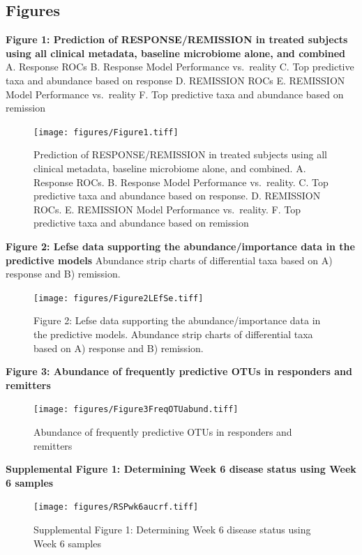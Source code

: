 \documentclass[11pt,]{article}
\begin{document}
\newpage

\subsection{Figures}\label{figures}

\textbf{Figure 1: Prediction of RESPONSE/REMISSION in treated subjects
using all clinical metadata, baseline microbiome alone, and combined} A.
Response ROCs B. Response Model Performance vs.~reality C. Top
predictive taxa and abundance based on response D. REMISSION ROCs E.
REMISSION Model Performance vs.~reality F. Top predictive taxa and
abundance based on remission

\begin{figure}
\centering
\texttt{[image: figures/Figure1.tiff]}
\caption{Prediction of RESPONSE/REMISSION in treated subjects using all
clinical metadata, baseline microbiome alone, and combined. A. Response
ROCs. B. Response Model Performance vs.~reality. C. Top predictive taxa
and abundance based on response. D. REMISSION ROCs. E. REMISSION Model
Performance vs.~reality. F. Top predictive taxa and abundance based on
remission}
\end{figure}

\newpage

\textbf{Figure 2: Lefse data supporting the abundance/importance data in
the predictive models} Abundance strip charts of differential taxa based
on A) response and B) remission.

\begin{figure}
\centering
\texttt{[image: figures/Figure2LEfSe.tiff]}
\caption{Figure 2: Lefse data supporting the abundance/importance data
in the predictive models. Abundance strip charts of differential taxa
based on A) response and B) remission.}
\end{figure}

\newpage

\textbf{Figure 3: Abundance of frequently predictive OTUs in responders
and remitters}

\begin{figure}
\centering
\texttt{[image: figures/Figure3FreqOTUabund.tiff]}
\caption{Abundance of frequently predictive OTUs in responders and
remitters}
\end{figure}

\newpage

\textbf{Supplemental Figure 1: Determining Week 6 disease status using
Week 6 samples}

\begin{figure}
\centering
\texttt{[image: figures/RSPwk6aucrf.tiff]}
\caption{Supplemental Figure 1: Determining Week 6 disease status using
Week 6 samples}
\end{figure}
\end{document}
